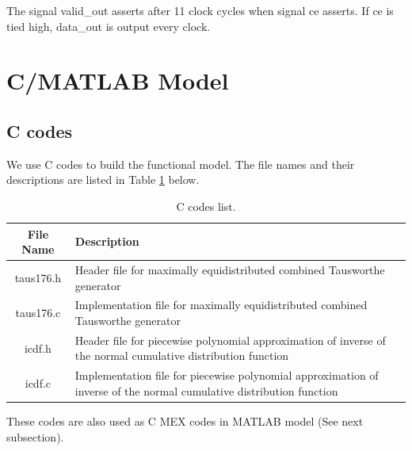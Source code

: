 \documentclass[a4paper, titlepage]{article}
\begin{document}
The signal \textsf{valid\_out} asserts after 11 clock cycles
when signal \textsf{ce} asserts.
If \textsf{ce} is tied high, \textsf{data\_out} is output every clock.


\section{C/MATLAB Model}

\subsection{C codes}
We use C codes to build the functional model.
The file names and their descriptions are listed in Table \ref{tbl:ccode} below.
\begin{table}[!htbp]
\centering
\caption{C codes list.}
\label{tbl:ccode}
\begin{tabular}{cp{8cm}}
    \addlinespace
    \toprule

    \textbf{File Name} & \textbf{Description} \\

    \midrule

    \textsf{taus176.h} &
        Header file for maximally equidistributed combined Tausworthe generator \\
    \textsf{taus176.c} &
        Implementation file for maximally equidistributed combined Tausworthe generator \\
    \textsf{icdf.h} &
        Header file for piecewise polynomial approximation of inverse of
        the normal cumulative distribution function \\
    \textsf{icdf.c} &
        Implementation file for piecewise polynomial approximation of inverse of
        the normal cumulative distribution function \\

    \bottomrule
\end{tabular}
\end{table}

These codes are also used as C MEX codes in MATLAB model (See next subsection).
\end{document}

